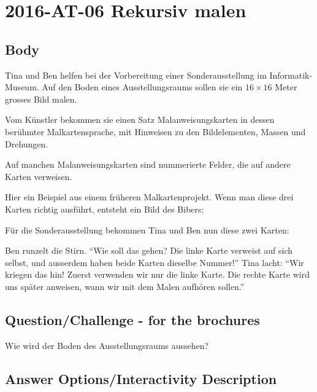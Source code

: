\documentclass[a4paper,11pt]{report}
\newcommand{\taskGraphicsFolder}{..}
\begin{document}
\section*{\centering{} 2016-AT-06 Rekursiv malen}


\subsection*{Body}

Tina und Ben helfen bei der Vorbereitung einer Sonderausstellung im Informatik-Museum.
Auf den Boden eines Ausstellungsraums sollen sie ein ${16 \times 16}$ Meter grosses Bild malen.

Vom Künstler bekommen sie einen Satz Malanweisungskarten in dessen berühmter Malkartensprache,
mit Hinweisen zu den Bildelementen, Massen und Drehungen.

Auf manchen Malanweisungskarten sind nummerierte Felder, die auf andere Karten verweisen.

Hier ein Beispiel aus einem früheren Malkartenprojekt.
Wenn man diese drei Karten richtig ausführt, entsteht ein Bild des Bibers:

{\centering%
\par}

Für die Sonderausstellung bekommen Tina und Ben nun diese zwei Karten:

{\centering%
\par}

Ben runzelt die Stirn. \enquote{Wie soll das gehen? Die linke Karte verweist auf sich selbst,
und ausserdem haben beide Karten dieselbe Nummer!}
Tina lacht: \enquote{Wir kriegen das hin! Zuerst verwenden wir nur die linke Karte.
Die rechte Karte wird uns später anweisen, wann wir mit dem Malen aufhören sollen.}

{\em


\subsection*{Question/Challenge - for the brochures}

Wie wird der Boden des Ausstellungsraums aussehen?

}

\begingroup
\renewcommand{\arraystretch}{1.5}
\subsection*{Answer Options/Interactivity Description}
\end{document}

